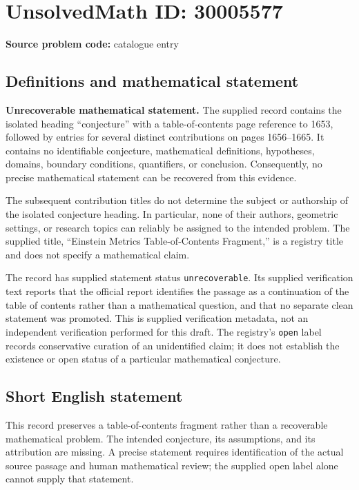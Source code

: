 \documentclass[11pt]{article}
\begin{document}
\section*{UnsolvedMath ID: 30005577}
\textbf{Source problem code:} catalogue entry
\subsection{Definitions and mathematical statement}
\textbf{Unrecoverable mathematical statement.} The supplied record contains the isolated heading ``conjecture'' with a table-of-contents page reference to 1653, followed by entries for several distinct contributions on pages 1656--1665. It contains no identifiable conjecture, mathematical definitions, hypotheses, domains, boundary conditions, quantifiers, or conclusion. Consequently, no precise mathematical statement can be recovered from this evidence.

The subsequent contribution titles do not determine the subject or authorship of the isolated conjecture heading. In particular, none of their authors, geometric settings, or research topics can reliably be assigned to the intended problem. The supplied title, ``Einstein Metrics Table-of-Contents Fragment,'' is a registry title and does not specify a mathematical claim.

The record has supplied statement status \texttt{unrecoverable}. Its supplied verification text reports that the official report identifies the passage as a continuation of the table of contents rather than a mathematical question, and that no separate clean statement was promoted. This is supplied verification metadata, not an independent verification performed for this draft. The registry's \texttt{open} label records conservative curation of an unidentified claim; it does not establish the existence or open status of a particular mathematical conjecture.
\subsection{Short English statement}
This record preserves a table-of-contents fragment rather than a recoverable mathematical problem. The intended conjecture, its assumptions, and its attribution are missing. A precise statement requires identification of the actual source passage and human mathematical review; the supplied open label alone cannot supply that statement.
\end{document}
